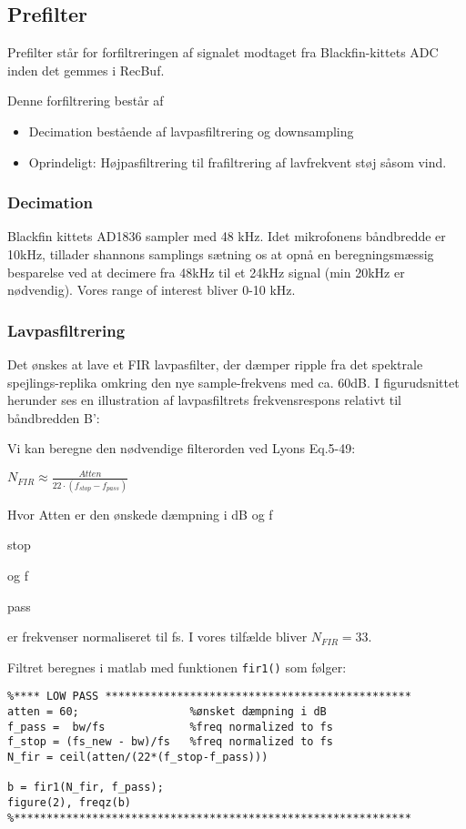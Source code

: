 \subsection{Prefilter}
Prefilter står for forfiltreringen af signalet modtaget fra Blackfin-kittets ADC inden det gemmes i RecBuf.

Denne forfiltrering består af
\begin{itemize}
	\item Decimation bestående af lavpasfiltrering og downsampling
	\item Oprindeligt: Højpasfiltrering til frafiltrering af lavfrekvent støj såsom vind.
\end{itemize}

\subsubsection{Decimation}
Blackfin kittets AD1836 sampler med 48 kHz. Idet mikrofonens båndbredde er 10kHz, tillader shannons samplings sætning os at opnå en beregningsmæssig besparelse ved at decimere fra 48kHz til et 24kHz signal (min 20kHz er nødvendig).
Vores range of interest bliver 0-10 kHz.

\subsubsection*{Lavpasfiltrering} 
Det ønskes at lave et FIR lavpasfilter, der dæmper ripple fra det spektrale spejlings-replika omkring den nye sample-frekvens med ca. 60dB. 
I figurudsnittet herunder ses en illustration af lavpasfiltrets frekvensrespons relativt til båndbredden B':

Vi kan beregne den nødvendige filterorden ved Lyons Eq.5-49:
\begin{center}
${ N }_{ FIR }\approx \frac { Atten }{ 22\cdot \left( { f }_{ stop }-{ f }_{ pass } \right)  }$
\end{center}
Hvor Atten er den ønskede dæmpning i dB og f\begin{tiny}stop\end{tiny} og f\begin{tiny}pass\end{tiny} er frekvenser normaliseret til fs. I vores tilfælde bliver ${ N }_{ FIR }=33$.

Filtret beregnes i matlab med funktionen \verb+fir1()+ som følger:
\begin{verbatim}%**** LOW PASS ***********************************************
atten = 60;                 %ønsket dæmpning i dB
f_pass =  bw/fs             %freq normalized to fs
f_stop = (fs_new - bw)/fs   %freq normalized to fs
N_fir = ceil(atten/(22*(f_stop-f_pass)))

b = fir1(N_fir, f_pass);
figure(2), freqz(b)
%*************************************************************
\end{verbatim}

